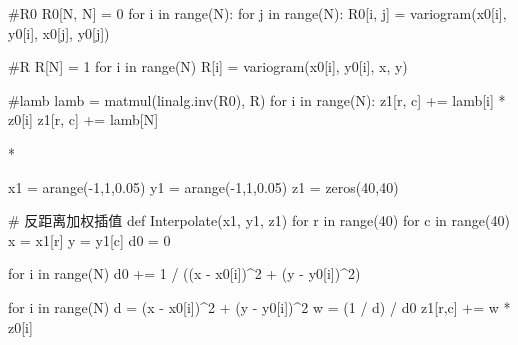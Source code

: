 								#R0
								R0[N, N] = 0
								for i in range(N):
									for j in range(N):
										R0[i, j] = variogram(x0[i], y0[i], x0[j], y0[j])

								#R
								R[N] = 1
								for i in range(N)
									R[i] = variogram(x0[i], y0[i], x, y)

								#lamb
								lamb = matmul(linalg.inv(R0), R)
								for i in range(N):
									z1[r, c] += lamb[i] * z0[i]
								z1[r, c] += lamb[N]

		* 
		
			\Codes
				x1 = arange(-1,1,0.05)
				y1 = arange(-1,1,0.05)
				z1 = zeros(40,40)
				
				# 反距离加权插值
				def Interpolate(x1, y1, z1)
					for r in range(40)
						for c in range(40)
							x = x1[r]
							y = y1[c]
							d0 = 0

							for i in range(N)
								d0 += 1 / ((x - x0[i])^2 + (y - y0[i])^2)

							for i in range(N)
								d = (x - x0[i])^2 + (y - y0[i])^2
								w = (1 / d) / d0
								z1[r,c] += w * z0[i]
